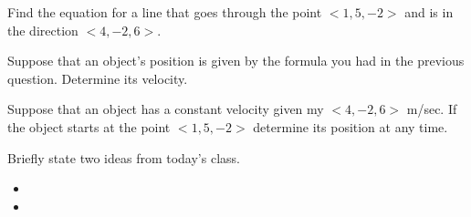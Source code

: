 \begin{problem}
\item Find the equation for a line that goes through the point
  $<1,5,-2>$  and is in the direction  $<4,-2,6>$.

  \vfill

\item Suppose that an object's position is given by the formula you
  had in the previous question. Determine its velocity.

  \vfill

\clearpage
\item Suppose that an object has a constant velocity given my
  $<4,-2,6>$ m/sec. If the object starts at the point $<1,5,-2>$
  determine its position at any time.

  \vfill

\end{problem}


\postClass

\begin{problem}
\item Briefly state two ideas from today's class.
  \begin{itemize}
  \item
  \item
  \end{itemize}
\item
  \begin{subproblem}
    \item
  \end{subproblem}
\end{problem}



